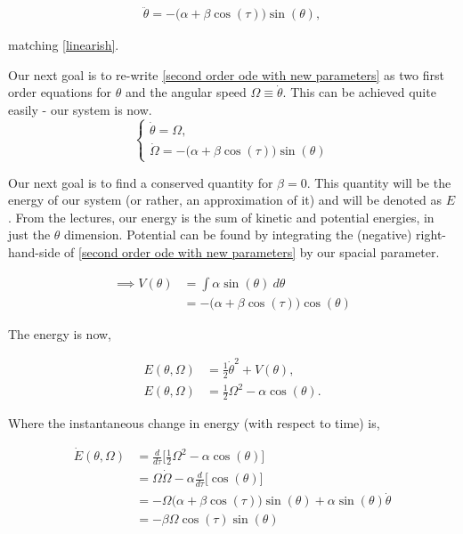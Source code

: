 \documentclass[12pt]{article}
\begin{document}
\begin{enumerate}[]
\begin{solution}
        \begin{align}
            \ddot{\theta} = -\big(\alpha + \beta \cos(\tau)\big)\sin(\theta),   \label{second order ode with new parameters}
        \end{align}

        matching \ref{linearish}. 

        Our next goal is to re-write \ref{second order ode with new parameters} as two first order equations for $\theta$ and the angular speed $\Omega \equiv \dot{\theta}$. This can be achieved quite easily - our system is now. 
        \begin{equation}
        \begin{cases}
            \dot{\theta} = \Omega, \\
            \dot{\Omega} = -\big(\alpha + \beta \cos(\tau)\big)\sin(\theta) \label{Nonlinear system}
        \end{cases}    
        \end{equation}

        Our next goal is to find a conserved quantity for $\beta = 0$. This quantity will be the energy of our system (or rather, an approximation of it) and will be denoted as $E$. From the lectures, our energy is the sum of kinetic and potential energies, in just the $\theta$ dimension. Potential can be found by integrating the (negative) right-hand-side of \ref{second order ode with new parameters} by our spacial parameter. 

        \begin{align}
            \implies V(\theta) &= \int \alpha\sin(\theta) \ d\theta \nonumber\\
            &= -\big(\alpha + \beta\cos(\tau))\cos(\theta)
        \end{align}

        The energy is now,

        \begin{align}
            E(\theta, \Omega) &= \frac{1}{2} \dot{\theta}^2 + V(\theta),    \nonumber   \\
            E(\theta, \Omega) &= \frac{1}{2} \Omega^2 -\alpha\cos(\theta).
        \end{align}

        Where the instantaneous change in energy (with respect to time) is,

        \begin{align}
            \dot{E}(\theta, \Omega) &=  \frac{d}{d\tau}\bigg[ \frac{1}{2}\Omega^2 - \alpha\cos(\theta) \bigg]  \nonumber\\
            &= \Omega\dot{\Omega} - \alpha\frac{d}{d\tau}\bigg[ \cos(\theta) \bigg] \nonumber\\
            &= -\Omega\big(\alpha + \beta \cos(\tau)\big)\sin(\theta) + \alpha\sin(\theta)\dot{\theta}\nonumber\\
            &= -\beta\Omega\cos(\tau)\sin(\theta)
        \end{align}
        \end{solution}


\end{enumerate}
\end{document}
